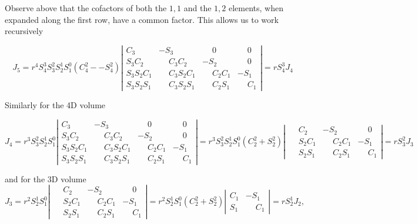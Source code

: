 {Observe above that the cofactors of both the $1,1$ and the $1,2$ elements, when expanded along the first row, have a common factor.  This allows us to work recursively

\begin{dmath}\label{eqn:basicStatMechProblemSet3Problem1:200}
J_5 
= r^4 S_4^3 S_3^2 S_2^1 S_1^0
(C_4^2 - - S_4^2)
\left\lvert
\begin{array}{llll}
C_3           &          -  S_3          & \phantom{-} 0       & \phantom{-} 0    \\
S_3 C_2       & \phantom{-} C_3 C_2      &          -  S_2     & \phantom{-} 0    \\
S_3 S_2 C_1   & \phantom{-} C_3 S_2 C_1  & \phantom{-} C_2 C_1 &          -  S_1  \\
S_3 S_2 S_1   & \phantom{-} C_3 S_2 S_1  & \phantom{-} C_2 S_1 & \phantom{-} C_1   
\end{array}
\right\rvert
=
r S_4^3 J_4
\end{dmath}

Similarly for the 4D volume

\begin{dmath}\label{eqn:basicStatMechProblemSet3Problem1:220}
J_4  
= r^3 S_3^2 S_2^1 S_1^0
\left\lvert
\begin{array}{llll}
C_3           &          -  S_3          & \phantom{-} 0       & \phantom{-} 0    \\
S_3 C_2       & \phantom{-} C_3 C_2      &          -  S_2     & \phantom{-} 0    \\
S_3 S_2 C_1   & \phantom{-} C_3 S_2 C_1  & \phantom{-} C_2 C_1 &          -  S_1  \\
S_3 S_2 S_1   & \phantom{-} C_3 S_2 S_1  & \phantom{-} C_2 S_1 & \phantom{-} C_1   
\end{array}
\right\rvert
= r^3 S_3^2 S_2^1 S_1^0 (C_2^2 + S_2^2)
\left\lvert
\begin{array}{lll}
\phantom{-} C_2      &          -  S_2     & \phantom{-} 0    \\
\phantom{-} S_2 C_1  & \phantom{-} C_2 C_1 &          -  S_1  \\
\phantom{-} S_2 S_1  & \phantom{-} C_2 S_1 & \phantom{-} C_1   
\end{array}
\right\rvert
= r S_3^2 J_3
\end{dmath}

and for the 3D volume
\begin{dmath}\label{eqn:basicStatMechProblemSet3Problem1:240}
J_3  
= r^2 S_2^1 S_1^0
\left\lvert
\begin{array}{lll}
\phantom{-} C_2      &          -  S_2     & \phantom{-} 0    \\
\phantom{-} S_2 C_1  & \phantom{-} C_2 C_1 &          -  S_1  \\
\phantom{-} S_2 S_1  & \phantom{-} C_2 S_1 & \phantom{-} C_1   
\end{array}
\right\rvert
= r^2 S_2^1 S_1^0 (C_2^2 + S_2^2)
\left\lvert
\begin{array}{ll}
C_1 &          -  S_1  \\
S_1 & \phantom{-} C_1   
\end{array}
\right\rvert
= r S_2^1 J_2,
\end{dmath}

}
